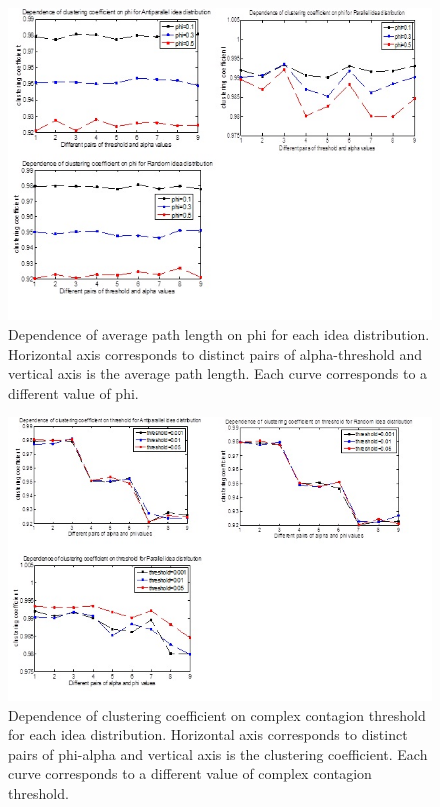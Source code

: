 \begin{figure}
[htp]
\begin{center}
\includegraphics{Fig16}
\end{center}
\caption{Dependence of average path length on phi for each idea distribution. Horizontal axis corresponds to distinct pairs of alpha-threshold and vertical axis is the average path length. Each curve corresponds to a different value of phi. }
\label {fig16}
\end{figure}

\begin{figure}
[htp]
\begin{center}
\includegraphics{Fig19}
\end{center}
\caption{Dependence of clustering coefficient on complex contagion threshold for each idea distribution. Horizontal axis corresponds to distinct pairs of phi-alpha and   vertical axis is the clustering coefficient. Each curve corresponds to a different value of complex contagion threshold.}
\label {fig19}
\end{figure}

